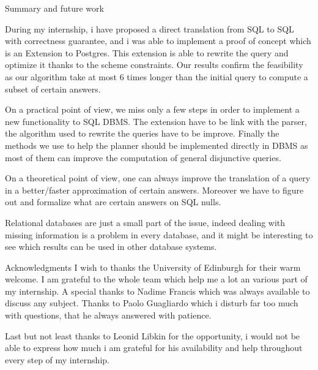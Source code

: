 \begin{point}{Summary and future work}
  
 During my internship, i have proposed a direct translation from SQL to SQL with correctness guarantee, and i was able to implement a proof of concept which is an Extension to Postgres. This extension is able to rewrite the query and optimize it thanks to the scheme constraints. Our results confirm the feasibility as our algorithm take at most 6 times longer than the initial query to compute a subset of certain answers. 
 
 On a practical point of view, we miss only a few steps in order to implement a new functionality to SQL DBMS. The extension have to be link with the parser, the algorithm used to rewrite the queries have to be improve. Finally the methods we use to help the planner should be implemented directly in DBMS as most of them can improve the computation of general disjunctive queries.
 
 On a theoretical point of view, one can always improve the translation of a query in a better/faster approximation of certain answers. Moreover we have to figure out and formalize what are certain answers on SQL nulls. 
 
 Relational databases are just a small part of the issue, indeed dealing with missing information is a problem in every database, and it might be interesting to see which results can be used in other database systems.

\end{point}

\begin{point}{Acknowledgments}
	I wish to thanks the University of Edinburgh for their warm welcome. I am grateful to the whole team which help me a lot an various part of my internship. A special  thanks to Nadime Francis which was always available to discuss any subject. Thanks to Paolo Guagliardo which i disturb far too much with questions, that he always answered with patience. 
	
	Last but not least thanks to Leonid Libkin for the opportunity, i would not be able to express how much i am grateful for his availability and help throughout every step of my internship. 
\end{point}


% 





